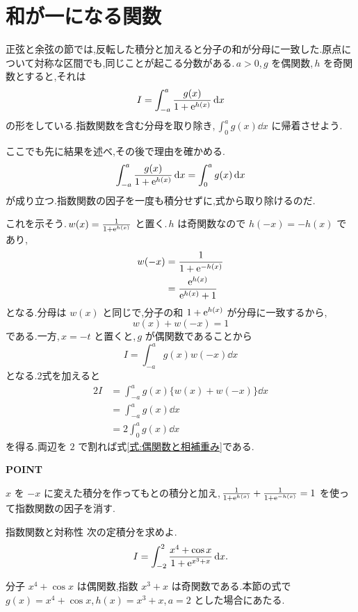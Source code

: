 \section{和が一になる関数}\label{節:相補重み}

正弦と余弦の節では,反転した積分と加えると分子の和が分母に一致した.原点について対称な区間でも,同じことが起こる分数がある.\,$a>0$,\,$g$ を偶関数,\,$h$ を奇関数とすると,それは
\[
I=\int_{-a}^a\frac{g(x)}{1+\mathrm{e}^{h(x)}}\,\mathrm{d} x
\]
の形をしている.指数関数を含む分母を取り除き,\,$\int_0^a g(x)\dd x$ に帰着させよう.

ここでも先に結果を述べ,その後で理由を確かめる.
\begin{equation}\label{式:偶関数と相補重み}
\int_{-a}^a\frac{g(x)}{1+\mathrm{e}^{h(x)}}\,\mathrm{d} x
 =\int_0^a g(x)\,\mathrm{d} x
\end{equation}
が成り立つ.指数関数の因子を一度も積分せずに,式から取り除けるのだ.

これを示そう.\,$w(x)=\frac{1}{1+\mathrm{e}^{h(x)}}$ と置く.\,$h$ は奇関数なので $h(-x)=-h(x)$ であり,
\[
\begin{aligned}
w(-x)&=\frac{1}{1+\mathrm{e}^{-h(x)}}\\
 &=\frac{\mathrm{e}^{h(x)}}{\mathrm{e}^{h(x)}+1}
\end{aligned}
\]
となる.分母は $w(x)$ と同じで,分子の和 $1+\mathrm{e}^{h(x)}$ が分母に一致するから,
\[
w(x)+w(-x)=1
\]
である.一方,\,$x=-t$ と置くと,\,$g$ が偶関数であることから
\[
I=\int_{-a}^a g(x)w(-x)\dd x
\]
となる.2式を加えると
\[
\begin{aligned}
2I&=\int_{-a}^a g(x)\{w(x)+w(-x)\}\dd x\\
 &=\int_{-a}^a g(x)\dd x\\
 &=2\int_0^a g(x)\dd x
\end{aligned}
\]
を得る.両辺を $2$ で割れば式\eqref{式:偶関数と相補重み}である.

\begin{bookpoint}
\textbf{POINT}\par
$x$ を $-x$ に変えた積分を作ってもとの積分と加え,\,$\frac{1}{1+\mathrm{e}^{h(x)}}+\frac{1}{1+\mathrm{e}^{-h(x)}}=1$ を使って指数関数の因子を消す.
\end{bookpoint}

\begin{example}{指数関数と対称性}
次の定積分を求めよ.
\[
I=\int_{-2}^2\frac{x^4+\cos x}{1+\mathrm{e}^{x^3+x}}\,\mathrm{d} x.
\]
\end{example}

分子 $x^4+\cos x$ は偶関数,指数 $x^3+x$ は奇関数である.本節の式で $g(x)=x^4+\cos x$,\,$h(x)=x^3+x$,\,$a=2$ とした場合にあたる.

